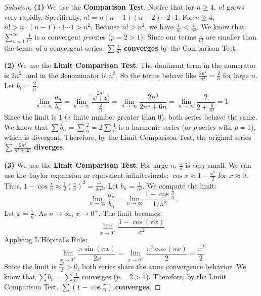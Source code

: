 \documentclass[11pt]{article}
\theoremstyle{definition}
\newenvironment{solution}{\begin{proof}[Solution]}{\end{proof}}
\begin{document}
\begin{solution}
\textbf{(1)} We use the \textbf{Comparison Test}. Notice that for $n \ge 4$, $n!$ grows very rapidly.
Specifically, $n! = n(n-1)(n-2) \cdots 2 \cdot 1$.
For $n \ge 4$, $n! > n \cdot (n-1) \cdot 1 \cdots 1 > n^2$.
Because $n! > n^2$, we have $\frac{1}{n!} < \frac{1}{n^2}$.
We know that $\sum_{n=1}^{\infty} \frac{1}{n^2}$ is a convergent $p$-series ($p=2 > 1$).
Since our terms $\frac{1}{n!}$ are smaller than the terms of a convergent series, $\sum \frac{1}{n!}$ \textbf{converges} by the Comparison Test.

\textbf{(2)} We use the \textbf{Limit Comparison Test}. The dominant term in the numerator is $2n^2$, and in the denominator is $n^3$. So the terms behave like $\frac{2n^2}{n^3} = \frac{2}{n}$ for large $n$. Let $b_n = \frac{2}{n}$.
\[
\lim_{n \to \infty} \frac{a_n}{b_n} = \lim_{n \to \infty} \frac{\frac{2n^2}{n^3+3n}}{\frac{2}{n}} = \lim_{n \to \infty} \frac{2n^3}{2n^3+6n} = \lim_{n \to \infty} \frac{2}{2+\frac{6}{n^2}} = 1
\]
Since the limit is $1$ (a finite number greater than $0$), both series behave the same.
We know that $\sum b_n = \sum \frac{2}{n} = 2\sum \frac{1}{n}$ is a harmonic series (or $p$-series with $p=1$), which is divergent.
Therefore, by the Limit Comparison Test, the original series $\sum \frac{2n^2}{n^3+3n}$ \textbf{diverges}.

\textbf{(3)} We use the \textbf{Limit Comparison Test}. For large $n$, $\frac{\pi}{n}$ is very small. We can use the Taylor expansion or equivalent infinitesimals: $\cos x \approx 1 - \frac{x^2}{2}$ for $x \approx 0$.
Thus, $1 - \cos\frac{\pi}{n} \approx \frac{1}{2}\left(\frac{\pi}{n}\right)^2 = \frac{\pi^2}{2n^2}$.
Let $b_n = \frac{1}{n^2}$. We compute the limit:
\[
\lim_{n \to \infty} \frac{a_n}{b_n} = \lim_{n \to \infty} \frac{1-\cos\frac{\pi}{n}}{1/n^2}
\]
Let $x = \frac{1}{n}$. As $n \to \infty$, $x \to 0^+$. The limit becomes:
\[
\lim_{x \to 0^+} \frac{1-\cos(\pi x)}{x^2}
\]
Applying L'Hôpital's Rule:
\[
\lim_{x \to 0^+} \frac{\pi\sin(\pi x)}{2x} = \lim_{x \to 0^+} \frac{\pi^2\cos(\pi x)}{2} = \frac{\pi^2}{2}
\]
Since the limit is $\frac{\pi^2}{2} > 0$, both series share the same convergence behavior.
We know that $\sum b_n = \sum \frac{1}{n^2}$ converges ($p=2>1$).
Therefore, by the Limit Comparison Test, $\sum \left(1-\cos \frac{\pi}{n}\right)$ \textbf{converges}.


\end{solution}
\end{document}

